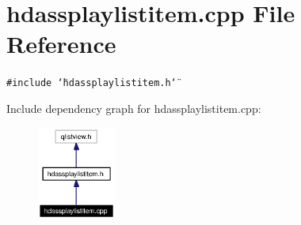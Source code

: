 \section{hdassplaylistitem.cpp File Reference}
\label{hdassplaylistitem_8cpp}


{\tt \#include \char`\"{}hdassplaylistitem.h\char`\"{}}\par


Include dependency graph for hdassplaylistitem.cpp:\begin{figure}[H]
\begin{center}
\leavevmode
\includegraphics[width=73pt]{hdassplaylistitem_8cpp__incl}
\end{center}
\end{figure}
